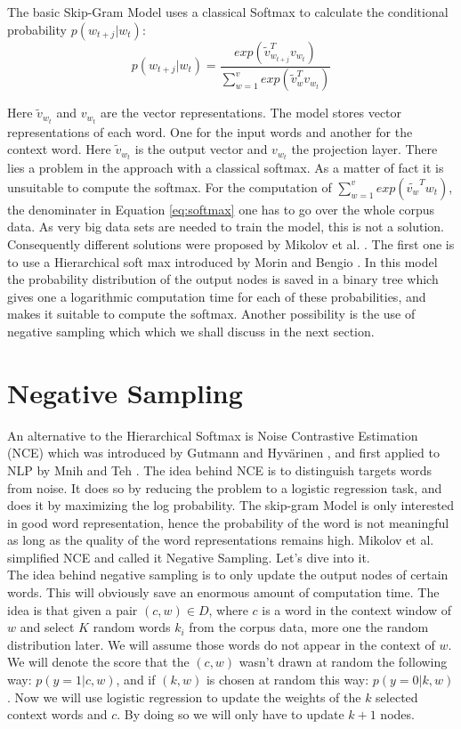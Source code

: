 {The basic Skip-Gram Model uses a classical Softmax to calculate the conditional probability $p(w_{t+j}|w_t)$: 
   \begin{equation}
   p(w_{t+j}|w_t)=  \frac{exp( \tilde{v}_{w_{t+j}}^Tv_{w_t})}{\sum_{w=1}^v exp(\tilde{v}_w^Tv_{ w_t})}
   \end{equation}\label{eq:softmax}
  
  Here $\tilde{v}_{w_t}$ and $ v_{w_t}$ are the vector representations. The model stores vector representations of each word. One for the input words and another for the context word. Here $\tilde{v}_{w_t}$ is the output vector and  $ v_{w_t}$ the projection layer. There lies a problem in the approach with a classical softmax. As a matter of fact it is unsuitable to compute the softmax. For the computation of $\sum_{w=1}^v exp(\tilde{v_w}^T w_t)$, the denominater in Equation \ref{eq:softmax} one has to go over the whole corpus data. As very big data sets are needed to train the model, this is not a solution. Consequently different solutions were proposed by Mikolov et al. \cite{mikolov2}. The first one is to use a Hierarchical soft max introduced by Morin and Bengio \cite{hsoftmax}. In this model the probability distribution of the output nodes is saved in a binary tree which gives one a logarithmic computation time for each of these probabilities, and makes it suitable to compute the softmax. Another possibility is the use of negative sampling which which we shall discuss in the next section. 

\section{Negative Sampling}
An alternative to the Hierarchical Softmax is Noise Contrastive Estimation (NCE) which was introduced by Gutmann and Hyv{\"a}rinen \cite{nce-original},  and first applied to NLP by Mnih and Teh \cite{mnih}. The idea behind NCE is to distinguish targets words from noise. It does so by reducing the problem to a logistic regression task, and does it by maximizing the log probability. The skip-gram Model is only interested in good word representation, hence the probability of the word is not meaningful as long as the quality of the word representations remains high. Mikolov et al. \cite{mikolov2} simplified NCE and called it Negative Sampling. Let's dive into it.\\
The idea behind negative sampling is to only update the output nodes of certain words. This will obviously save an enormous amount of computation time. The idea is that given a pair $(c,w) \in D$, where $c$ is a word in the context window of $w$ and  select $K$ random words $k_i$ from the corpus data, more one the random distribution later. We will assume those words do not appear in the context of $w$. We will denote the score that the $(c,w)$ wasn't drawn at random the following way: $p(y=1|c,w)$, and if $(k,w) $ is chosen at random this way: $p(y=0|k,w)$.  Now we will use logistic regression to update the weights of the $k$ selected context words and $c$. By doing so we will only have to update $k+1$ nodes.

}
